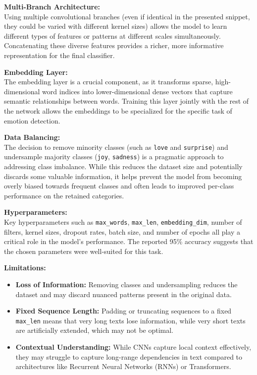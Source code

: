 \documentclass[twocolumn]{article}
\begin{document}
\vspace{0.5em}
\textbf{Multi-Branch Architecture:} \\
Using multiple convolutional branches (even if identical in the presented snippet, they could be varied with different kernel sizes) allows the model to learn different types of features or patterns at different scales simultaneously. Concatenating these diverse features provides a richer, more informative representation for the final classifier.

\vspace{0.5em}
\textbf{Embedding Layer:} \\
The embedding layer is a crucial component, as it transforms sparse, high-dimensional word indices into lower-dimensional dense vectors that capture semantic relationships between words. Training this layer jointly with the rest of the network allows the embeddings to be specialized for the specific task of emotion detection.

\vspace{0.5em}
\textbf{Data Balancing:} \\
The decision to remove minority classes (such as \texttt{love} and \texttt{surprise}) and undersample majority classes (\texttt{joy}, \texttt{sadness}) is a pragmatic approach to addressing class imbalance. While this reduces the dataset size and potentially discards some valuable information, it helps prevent the model from becoming overly biased towards frequent classes and often leads to improved per-class performance on the retained categories.

\vspace{0.5em}
\textbf{Hyperparameters:} \\
Key hyperparameters such as \texttt{max\_words}, \texttt{max\_len}, \texttt{embedding\_dim}, number of filters, kernel sizes, dropout rates, batch size, and number of epochs all play a critical role in the model’s performance. The reported 95\% accuracy suggests that the chosen parameters were well-suited for this task.

\vspace{0.5em}
\textbf{Limitations:}
\begin{itemize}
    \item \textbf{Loss of Information:} Removing classes and undersampling reduces the dataset and may discard nuanced patterns present in the original data.
    \item \textbf{Fixed Sequence Length:} Padding or truncating sequences to a fixed \texttt{max\_len} means that very long texts lose information, while very short texts are artificially extended, which may not be optimal.
    \item \textbf{Contextual Understanding:} While CNNs capture local context effectively, they may struggle to capture long-range dependencies in text compared to architectures like Recurrent Neural Networks (RNNs) or Transformers.
\end{itemize}
\end{document}
